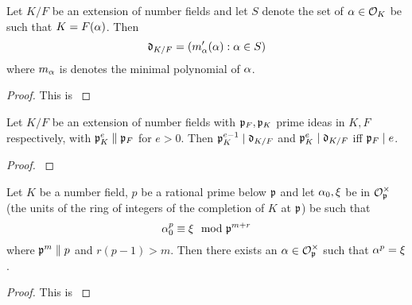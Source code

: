 \begin{lemma}\label{lem:diff_ideal_eqn}
    Let $K/F$ be an extension of number fields and let $S$ denote the set of $\alpha \in \mathcal{O}_K$ be such that $K=F(\alpha)$. Then \[ \mathfrak{d}_{K/F} = \left (m_{\alpha}'(\alpha) : \alpha \in S \right )\] where $m_\alpha$ is denotes the minimal polynomial of $\alpha$.

\end{lemma}

\begin{proof}
    This is \cite[Theorem 20]{SD}
\end{proof}

\begin{lemma}\label{lem:diff_ram}
    Let $K/F$ be an extension of number fields with $\mathfrak{p}_F, \mathfrak{p}_K$ prime ideas in $K,F$ respectively, with $\mathfrak{p}_K^e \parallel \mathfrak{p}_F$ for $e >0$. Then $\mathfrak{p}_K^{e-1} \mid \mathfrak{d}_{K/F}$ and $\mathfrak{p}_K^{e} \mid \mathfrak{d}_{K/F}$ iff $\mathfrak{p}_F \mid e$.
\end{lemma}

\begin{proof}
    \cite[Theorem 21]{SD}
\end{proof}

\begin{lemma}\label{lem:loc_ramification}
Let $K$ be a number field, $p$ be a rational prime below $\mathfrak{p}$ and let $\alpha_0, \xi$ be in $\mathcal{O}_{\mathfrak{p}}^\times$ (the units of the ring of integers of the completion of $K$ at $\mathfrak{p}$) be such that \[\alpha_0^p \equiv \xi \mod {\mathfrak{p}}^{m+r}\] where $\mathfrak{p}^m \parallel p$ and $r(p-1)>m$. Then there exists an $\alpha \in \mathcal{O}_{\mathfrak{p}}^\times$ such that $\alpha^p =\xi$.

\end{lemma}

\begin{proof}
    This is \cite[Lemma 20]{SD}
\end{proof}

